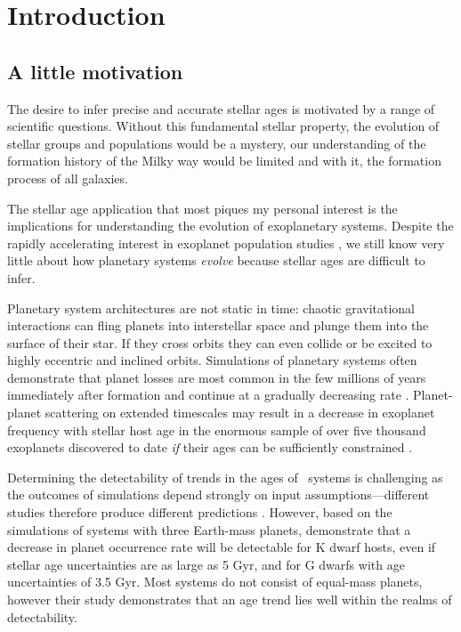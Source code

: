 \chapter{Introduction}
\label{chapter:intro}
\section{A little motivation}

The desire to infer precise and accurate stellar ages is motivated by a range
of scientific questions.
Without this fundamental stellar property, the evolution of stellar groups and
populations would be a mystery, our understanding of the formation history of
the Milky way would be limited and with it, the formation process of all
galaxies.

The stellar age application that most piques my personal interest is the
implications for understanding the evolution of exoplanetary systems.
Despite the rapidly accelerating interest in exoplanet population studies
\citep[e.g.][]{Petigura2013, Foreman-Mackey2014, Dressing2015, Burke2015}, we
still know very little about how planetary systems {\it evolve} because
stellar ages are difficult to infer.

Planetary system architectures are not static in time: chaotic gravitational
interactions can fling planets into interstellar space and plunge them into
the surface of their star.
If they cross orbits they can even collide or be excited to highly eccentric
and inclined orbits.
Simulations of planetary systems often demonstrate that planet losses are most
common in the few millions of years immediately after formation and continue
at a gradually decreasing rate \citep[e.g.][]{Zhou2007, Smith2009, Funk2010,
Pu2015}.
Planet-planet scattering on extended timescales may result in a decrease in
exoplanet frequency with stellar host age in the enormous sample of over five
thousand exoplanets discovered to date {\it if} their ages can be sufficiently
constrained \citep{Veras2015}.

Determining the detectability of trends in the ages of \Kepler\ systems is
challenging as the outcomes of simulations depend strongly on input
assumptions---different studies therefore produce different predictions
\citep[see figure 3 of][]{Pu2015}.
However, based on the \citet{Smith2009} simulations of systems with three
Earth-mass planets, \citet{Veras2015} demonstrate that a decrease in planet
occurrence rate will be detectable for K dwarf hosts, even if stellar age
uncertainties are as large as 5 Gyr, and for G dwarfs with age uncertainties of
3.5 Gyr.
Most systems do not consist of equal-mass planets, however their study
demonstrates that an age trend lies well within the realms of detectability.

